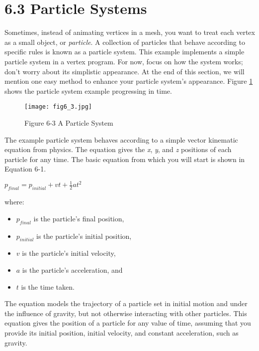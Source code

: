\documentclass[../main.tex]{subfiles}
\begin{document}
\section{6.3 Particle Systems}

Sometimes, instead of animating vertices in a mesh, you want to treat each vertex as a small object, or \textit{particle}. A collection of particles that behave according to specific rules is known as a particle system. This example implements a simple particle system in a vertex program. For now, focus on how the system works; don't worry about its simplistic appearance. At the end of this section, we will mention one easy method to enhance your particle system's appearance. Figure \ref{fig:6-3} shows the particle system example progressing in time.

\begin{figure}
    \centering
    \texttt{[image: fig6\_3.jpg]}
    \caption{Figure 6-3 A Particle System}
    \label{fig:6-3}
\end{figure}

The example particle system behaves according to a simple vector kinematic equation from physics. The equation gives the \textit{x}, \textit{y}, and \textit{z} positions of each particle for any time. The basic equation from which you will start is shown in Equation 6-1.

\FloatBarrier
\begin{equationcaption}
$
p_{final} = p_{initial} + vt + \frac{1}{2}at^2
$
\caption{Equation 6-1 Particle Trajectory}
\end{equationcaption}
\FloatBarrier

where:

\begin{itemize}
\item $p_{final}$ is the particle's final position,
\item $p_{initial}$ is the particle's initial position,
\item $v$ is the particle's initial velocity,
\item $a$ is the particle's acceleration, and
\item $t$ is the time taken.
\end{itemize}

The equation models the trajectory of a particle set in initial motion and under the influence of gravity, but not otherwise interacting with other particles. This equation gives the position of a particle for any value of time, assuming that you provide its initial position, initial velocity, and constant acceleration, such as gravity.
\end{document}

